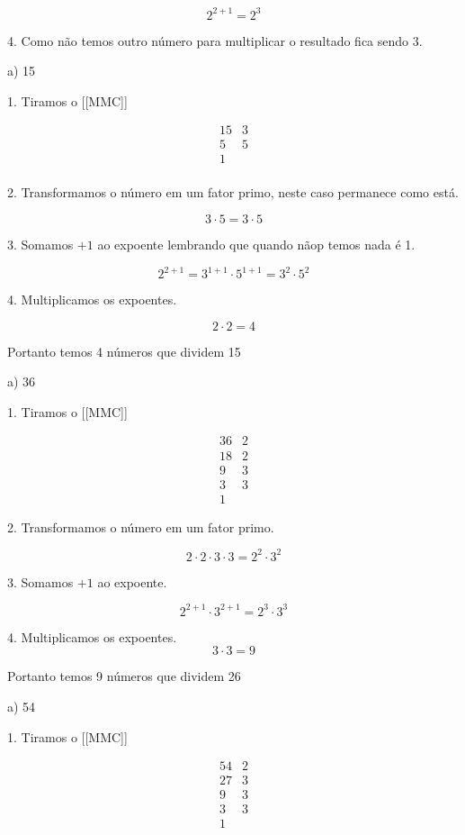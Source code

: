 \documentclass[letterpaper]{book}
\begin{document}
\[2^{2+1} = 2^{3}\]
	
4. Como não temos outro número para multiplicar o resultado fica sendo 3.

a) 15

1. Tiramos o [[MMC]]

\[
\begin{array}{c|ccc}
15 & 3 \\
5 & 5 \\
1 &   \\
\end{array}
\]

2. Transformamos o número em um fator primo, neste caso permanece como está.

\[3 \cdot 5 = 3 \cdot 5\]

3. Somamos \(+1\) ao expoente lembrando que quando nãop temos nada é 1.

\[2^{2+1} = 3^{1+1}\cdot 5^{1+1} = 3^{2}\cdot 5^{2}\]

4. Multiplicamos os expoentes.

\[2 \cdot 2 = 4\]

Portanto temos 4 números que dividem 15

a) 36

1. Tiramos o [[MMC]]

\[
\begin{array}{c|ccc}
36 & 2 \\
18 & 2 \\
9  & 3 \\
3  & 3 \\
1
\end{array}
\]

2. Transformamos o número em um fator primo.

\[2 \cdot 2 \cdot 3 \cdot 3 = 2^{2} \cdot 3^{2}\]

3. Somamos \(+1\) ao expoente.

\[2^{2+1} \cdot 3^{2+1} = 2^{3} \cdot 3^{3}\]

4. Multiplicamos os expoentes.
	\[3 \cdot 3 = 9\]

Portanto temos 9 números que dividem 26

a) 54 

1. Tiramos o [[MMC]]

\[
\begin{array}{c|ccc}
54 & 2 \\
27 & 3 \\
9  & 3 \\ 
3  & 3 \\
1 
\end{array}
\]
\end{document}

